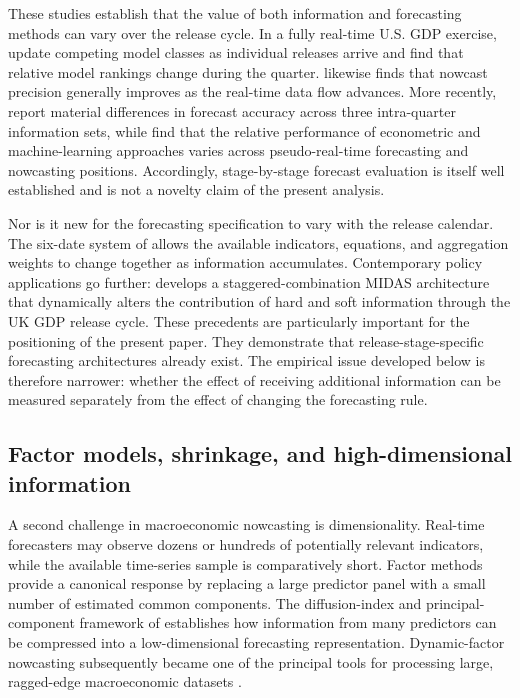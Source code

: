These studies establish that the value of both information and forecasting
methods can vary over the release cycle. In a fully real-time U.S. GDP exercise,
\citet{aastveit2014density} update competing model classes as individual
releases arrive and find that relative model rankings change during the
quarter. \citet{liebermann2014realtime} likewise finds that nowcast precision
generally improves as the real-time data flow advances.
More recently, \citet{heinrichreif2025realtime} report material differences in
forecast accuracy across three intra-quarter information sets, while
\citet{kantpickwinter2025ml} find that the relative performance of econometric
and machine-learning approaches varies across pseudo-real-time forecasting and
nowcasting positions. Accordingly, stage-by-stage forecast evaluation is itself
well established and is not a novelty claim of the present analysis.

Nor is it new for the forecasting specification to vary with the release
calendar. The six-date system of \citet{drechselmaurin2011flow} allows the
available indicators, equations, and aggregation weights to change together as
information accumulates. Contemporary policy applications go further:
\citet{moreira2025scmidas} develops a staggered-combination MIDAS architecture
that dynamically alters the contribution of hard and soft information through
the UK GDP release cycle. These precedents are particularly important for the
positioning of the present paper. They demonstrate that release-stage-specific
forecasting architectures already exist. The empirical issue developed below is
therefore narrower: whether the effect of receiving additional information can
be measured separately from the effect of changing the forecasting rule.


\subsection{Factor models, shrinkage, and high-dimensional information}
\label{subsec:lit_factor}

A second challenge in macroeconomic nowcasting is dimensionality. Real-time
forecasters may observe dozens or hundreds of potentially relevant indicators,
while the available time-series sample is comparatively short. Factor methods
provide a canonical response by replacing a large predictor panel with a small
number of estimated common components. The diffusion-index and
principal-component framework of \citet{stockwatson2002principal} establishes
how information from many predictors can be compressed into a low-dimensional
forecasting representation. Dynamic-factor nowcasting subsequently became one
of the principal tools for processing large, ragged-edge macroeconomic datasets
\citep{giannone2008nowcasting,banbura2011blackbox}.

